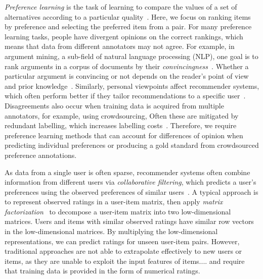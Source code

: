 %
\emph{Preference learning} is the task of learning to compare the values of a set of alternatives
according to a particular quality~\citep{furnkranz2010preference}. 
Here, we focus on ranking items by preference 
and selecting the preferred item from a pair.
For many preference learning tasks, people have divergent opinions on the correct rankings, %
which means that data from different annotators may not agree.
For example, in argument mining, 
a sub-field of natural language processing (NLP),
one goal is to rank arguments in a corpus of documents by their \emph{convincingness}~\citep{habernal2016argument}. 
Whether a particular argument is convincing or not depends on the reader's point of view and prior knowledge~\citep{lukin2017argument}.
Similarly, personal viewpoints affect recommender systems,
which often perform better if they tailor recommendations
to a specific user~\citep{resnick1997recommender}.
Disagreements also occur when training data is acquired from multiple annotators,
for example, using crowdsourcing,
Often  these are mitigated by redundant labelling, 
which increases labelling costs~\citep{snow2008cheap,banerji2010galaxy}.
Therefore, we require
preference learning methods that can account for differences of opinion
when predicting individual preferences or 
producing a gold standard from crowdsourced preference annotations.

As data from a single user is often sparse,
recommender systems often combine information from different users 
via \emph{collaborative filtering},  
which predicts a user's preferences 
using the observed preferences of similar users~\citep{resnick1997recommender}.
A typical approach is to represent observed ratings in a user-item matrix,
then apply \emph{matrix factorization}~\citep{koren2009matrix}
to decompose a user-item matrix into two low-dimensional matrices.
Users and items with similar observed ratings have similar row vectors in the low-dimensional
matrices. By multiplying the low-dimensional representations, we can predict ratings for unseen
user-item pairs. 
However, traditional approaches are not able to extrapolate effectively to new users or items,
as they are unable to exploit the input features of items....
and require that training data is provided in the form of numerical ratings.

